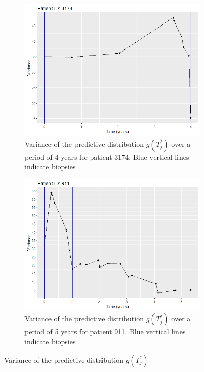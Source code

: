 \begin{figure}[!htb]
    \centering
    \captionsetup{justification=centering}
     \begin{subfigure}[b]{0.45\textwidth}
        \includegraphics[width=\textwidth]{images/variance/variance_pred_dist_3174.png}
        \caption{Variance of the predictive distribution $g(T^*_j)$ over a period of 4 years for patient 3174. Blue vertical lines indicate biopsies.}
        \label{fig : variance_pred_dist_3174}
    \end{subfigure}
    \begin{subfigure}[b]{0.45\textwidth}
        \includegraphics[width=\textwidth]{images/variance/variance_pred_dist_911.png}
        \caption{Variance of the predictive distribution $g(T^*_j)$ over a period of 5 years for patient 911. Blue vertical lines indicate biopsies.}
        \label{fig : variance_pred_dist_911}
    \end{subfigure}
    \caption{Variance of the predictive distribution $g(T^*_j)$}
    \label{fig : variance_pred_dist}
\end{figure}

